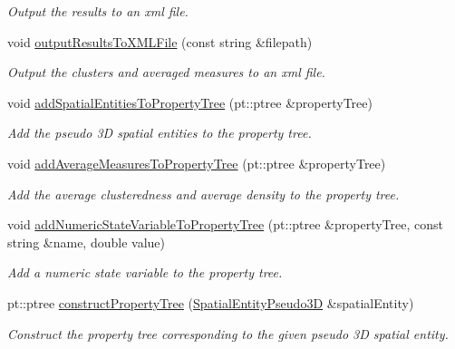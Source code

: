 \begin{DoxyCompactItemize}
\begin{DoxyCompactList}\small\item\em \-Output the results to an xml file. \end{DoxyCompactList}\item 
void \hyperlink{classmultiscale_1_1analysis_1_1Detector_a9f5690049f55799ac7a2741e97de679e}{output\-Results\-To\-X\-M\-L\-File} (const string \&filepath)
\begin{DoxyCompactList}\small\item\em \-Output the clusters and averaged measures to an xml file. \end{DoxyCompactList}\item 
void \hyperlink{classmultiscale_1_1analysis_1_1Detector_a11bf4fa46f51ac033b635d19e92998ae}{add\-Spatial\-Entities\-To\-Property\-Tree} (pt\-::ptree \&property\-Tree)
\begin{DoxyCompactList}\small\item\em \-Add the pseudo 3\-D spatial entities to the property tree. \end{DoxyCompactList}\item 
void \hyperlink{classmultiscale_1_1analysis_1_1Detector_a9cfa8c84d6cb13bf6d423b1db490668d}{add\-Average\-Measures\-To\-Property\-Tree} (pt\-::ptree \&property\-Tree)
\begin{DoxyCompactList}\small\item\em \-Add the average clusteredness and average density to the property tree. \end{DoxyCompactList}\item 
void \hyperlink{classmultiscale_1_1analysis_1_1Detector_aceaf8e69b2ce5d4d24a5c6e4debb296d}{add\-Numeric\-State\-Variable\-To\-Property\-Tree} (pt\-::ptree \&property\-Tree, const string \&name, double value)
\begin{DoxyCompactList}\small\item\em \-Add a numeric state variable to the property tree. \end{DoxyCompactList}\item 
pt\-::ptree \hyperlink{classmultiscale_1_1analysis_1_1Detector_af11495dceabe108397805a770fb9c7b4}{construct\-Property\-Tree} (\hyperlink{classmultiscale_1_1analysis_1_1SpatialEntityPseudo3D}{\-Spatial\-Entity\-Pseudo3\-D} \&spatial\-Entity)
\begin{DoxyCompactList}\small\item\em \-Construct the property tree corresponding to the given pseudo 3\-D spatial entity. \end{DoxyCompactList}\item 

\end{DoxyCompactItemize}
